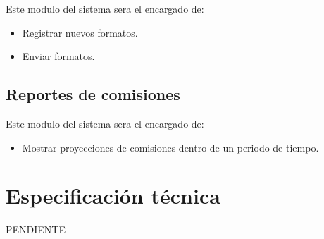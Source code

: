 Este modulo del sistema sera el encargado de:
\begin{itemize}
	\item Registrar nuevos formatos.
	\item Enviar formatos.
\end{itemize}

\subsection*{Reportes de comisiones}

Este modulo del sistema sera el encargado de:
\begin{itemize}
	\item Mostrar proyecciones de comisiones dentro de un periodo de tiempo.
\end{itemize}

\section{Especificación técnica}
PENDIENTE


